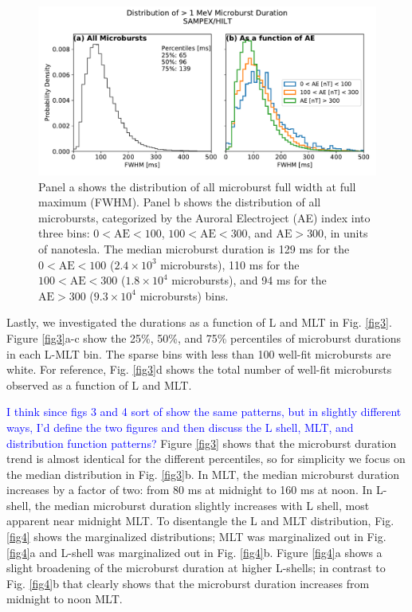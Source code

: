 \documentclass[draft]{agujournal2019}
\begin{document}
\begin{figure}
\noindent\includegraphics[width=\textwidth]{figures/fig2.pdf}
\caption{Panel a shows the distribution of all microburst full width at full maximum (FWHM). Panel b shows the distribution of all microbursts, categorized by the Auroral Electroject (AE) index into three bins: $0 < \mathrm{AE} < 100$, $100 < \mathrm{AE} < 300$, and $\mathrm{AE} > 300$, in units of nanotesla. The median microburst duration is 129 ms for the $0 < \mathrm{AE} < 100$ ($2.4\times 10^{3}$ microbursts), 110 ms for the $100 < \mathrm{AE} < 300$ ($1.8\times 10^{4}$ microbursts), and 94 ms for the $ \mathrm{AE} > 300$ ($9.3\times 10^{4}$ microbursts) bins.}
\label{fig2}
\end{figure}

Lastly, we investigated the durations as a function of L and MLT in Fig. \ref{fig3}. Figure \ref{fig3}a-c show the 25\%, 50\%, and 75\% percentiles of microburst durations in each L-MLT bin. The sparse bins with less than 100 well-fit microbursts are white. For reference, Fig. \ref{fig3}d shows the total number of well-fit microbursts observed as a function of L and MLT.


\textcolor{blue}{I think since figs 3 and 4 sort of show the same patterns, but in slightly different ways, I'd define the two figures and then discuss the L shell, MLT, and distribution function patterns?} Figure \ref{fig3} shows that the microburst duration trend is almost identical for the different percentiles, so for simplicity we focus on the median distribution in Fig. \ref{fig3}b. In MLT, the median microburst duration increases by a factor of two: from 80 ms at midnight to 160 ms at noon. In L-shell, the median microburst duration slightly increases with L shell, most apparent near midnight MLT. To disentangle the L and MLT distribution, Fig. \ref{fig4} shows the marginalized distributions; MLT was marginalized out in Fig. \ref{fig4}a and L-shell was marginalized out in Fig. \ref{fig4}b. Figure \ref{fig4}a shows a slight broadening of the microburst duration at higher L-shells; in contrast to Fig. \ref{fig4}b that clearly shows that the microburst duration increases from midnight to noon MLT.
\end{document}
